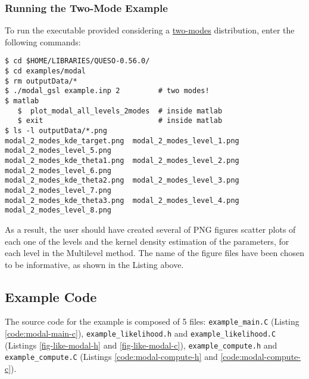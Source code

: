 \subsubsection{Running the Two-Mode Example}

To run the executable provided considering a \underline{two-modes} distribution, enter the following commands:
\begin{lstlisting}[label={},caption={Running the example with a two-mode distribution.}]
$ cd $HOME/LIBRARIES/QUESO-0.56.0/
$ cd examples/modal
$ rm outputData/*
$ ./modal_gsl example.inp 2         # two modes!
$ matlab
   $  plot_modal_all_levels_2modes  # inside matlab
   $ exit                           # inside matlab
$ ls -l outputData/*.png
modal_2_modes_kde_target.png  modal_2_modes_level_1.png  modal_2_modes_level_5.png
modal_2_modes_kde_theta1.png  modal_2_modes_level_2.png  modal_2_modes_level_6.png
modal_2_modes_kde_theta2.png  modal_2_modes_level_3.png  modal_2_modes_level_7.png
modal_2_modes_kde_theta3.png  modal_2_modes_level_4.png  modal_2_modes_level_8.png
\end{lstlisting}

As a result, the user should have created several of PNG figures scatter plots of each one of the levels and the kernel density estimation of the parameters, for each level in the Multilevel method. The name of the figure files have been chosen to be informative, as shown in the Listing above.



\subsection{Example Code}\label{sec:modal-code}

The source code for the example is composed of 5 files:
\texttt{example\_main.C} (Listing \ref{code:modal-main-c}), \linebreak
\texttt{example\_likelihood.h} and \texttt{example\_likelihood.C} (Listings \ref{fig-like-modal-h} and \ref{fig-like-modal-c}),
\texttt{example\_compute.h} and \texttt{example\_compute.C} (Listings \ref{code:modal-compute-h} and \ref{code:modal-compute-c}).






